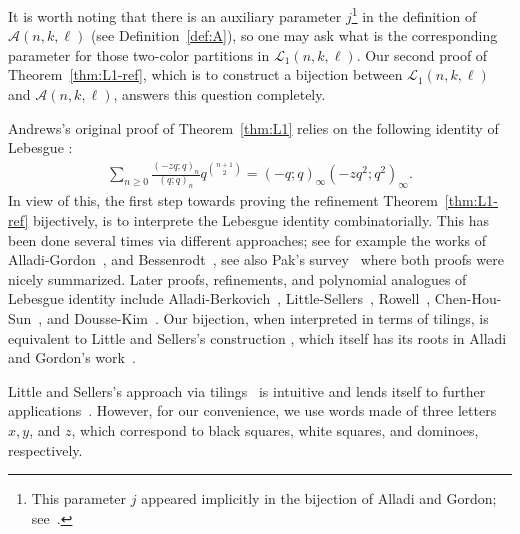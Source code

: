 \documentclass[11pt,reqno]{amsart}
\numberwithin{equation}{section}
\theoremstyle{plain}
\theoremstyle{definition}
\newcommand{\A}{\mathcal{A}}
\renewcommand{\L}{\mathcal{L}}
\begin{document}
It is worth noting that there is an auxiliary parameter $j$\footnote{This parameter $j$ appeared implicitly in the bijection of Alladi and Gordon; see~\cite[p.~26, Sect.~4.4]{pak06}.} in the definition of $\A(n,k,\ell)$ (see Definition~\ref{def:A}), so one may ask what is the corresponding parameter for those two-color partitions in $\L_1(n,k,\ell)$. Our second proof of Theorem~\ref{thm:L1-ref}, which is to construct a bijection between $\L_1(n,k,\ell)$ and $\A(n,k,\ell)$, answers this question completely.

Andrews's original proof of Theorem~\ref{thm:L1} relies on the following identity of Lebesgue \cite{leb40}:
\begin{align}
\sum_{n\ge 0}\frac{(-zq;q)_n}{(q;q)_n}q^{\binom{n+1}{2}}=(-q;q)_{\infty}(-zq^2;q^2)_{\infty}.
\end{align}
In view of this, the first step towards proving the refinement Theorem~\ref{thm:L1-ref} bijectively, is to interprete the Lebesgue identity combinatorially. This has been done several times via different approaches; see for example the works of Alladi-Gordon~\cite{AG}, and Bessenrodt~\cite{bes94}, see also Pak's survey~\cite{pak06} where both proofs were nicely summarized. Later proofs, refinements, and polynomial analogues of Lebesgue identity include Alladi-Berkovich~\cite{AB}, Little-Sellers~\cite{LS09}, Rowell~\cite{row10}, Chen-Hou-Sun~\cite{CHS}, and Dousse-Kim~\cite{DK}. Our bijection, when interpreted in terms of tilings, is equivalent to Little and Sellers's construction \cite{LS09}, which itself has its roots in Alladi and Gordon's work~\cite{AG}. 

Little and Sellers's approach via tilings~\cite{LS09} is intuitive and lends itself to further applications~\cite{LS10}. However, for our convenience, we use words made of three letters $x,y$, and $z$, which correspond to black squares, white squares, and dominoes, respectively. 
\end{document}
